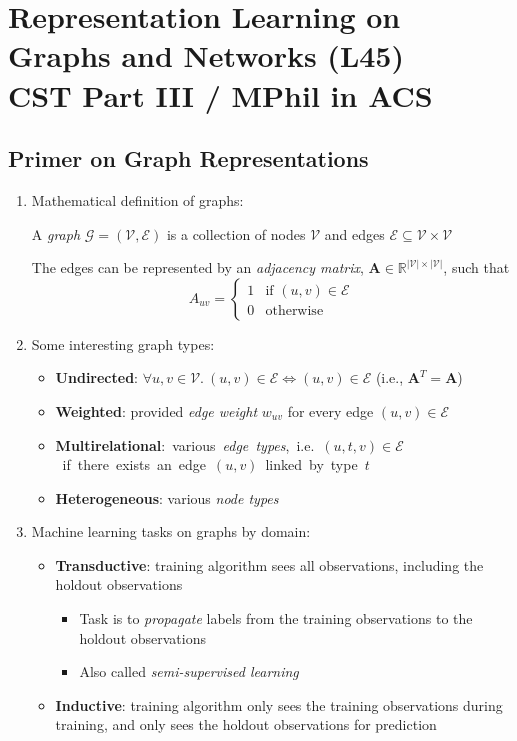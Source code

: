 \documentclass{article}
\author{Victor Zhao\\xz398@cam.ac.uk}
\begin{document}
\centering
\section*{Representation Learning on Graphs and Networks (L45)\\CST Part III / MPhil in ACS}
\MyAuthor

\justifying

\subsection{Primer on Graph Representations}

\begin{enumerate}
	\item Mathematical definition of graphs: 
	
	A \textit{graph} $\mathcal{G}=(\mathcal{V}, \mathcal{E})$ is a collection of nodes $\mathcal{V}$ and edges $\mathcal{E}\subseteq\mathcal{V}\times\mathcal{V}$
	
	The edges can be represented by an \textit{adjacency matrix}, $\mathbf{A}\in\mathbb{R}^{|\mathcal{V}|\times|\mathcal{V}|}$, such that
	$$A_{uv}=\begin{cases}
		1 &\text{if }(u,v)\in\mathcal{E}\\
		0 &\text{otherwise}
	\end{cases}$$

	\item Some interesting graph types:
	\begin{itemize}[topsep=0pt]
		\item \textbf{Undirected}: $\forall u, v\in\mathcal{V}.\ (u,v)\in\mathcal{E}\Longleftrightarrow (u,v)\in\mathcal{E}$ (i.e., $\mathbf{A}^T=\mathbf{A}$)
		\item \textbf{Weighted}: provided \textit{edge weight} $w_{uv}$ for every edge $(u,v)\in\mathcal{E}$
		\item \textbf{Multirelational}:~various~\textit{edge~types},~i.e.~$(u,t,v)\in\mathcal{E}$~if~there~exists~an~edge~$(u,v)$~linked~by~type~$t$
		\item \textbf{Heterogeneous}: various \textit{node types}
	\end{itemize}

	\item Machine learning tasks on graphs by domain:
	\begin{itemize}[topsep=0pt]
		\item \textbf{Transductive}: training algorithm sees all observations, including the holdout observations
		\begin{itemize}[topsep=0pt]
			\item Task is to \textit{propagate} labels from the training observations to the holdout observations 
			\item Also called \textit{semi-supervised learning}
		\end{itemize}
		\item \textbf{Inductive}: training algorithm only sees the training observations during training, and only sees the holdout observations for prediction
	\end{itemize}


\end{enumerate}
\end{document}
